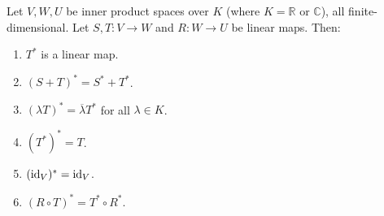 \begin{lemma}
\label{lem:properties_adjoint_map}
Let $V, W, U$ be inner product spaces over $K$ (where $K = \mathbb{R}$ or $\mathbb{C}$), all finite-di\-men\-sional. Let $S, T \colon V \to W$ and $R \colon W \to U$ be linear maps. Then:
\begin{enumerate}[label=\textbf{(\alph*)}]
    \item $T^*$ is a linear map.
    \item $(S+T)^* = S^* + T^*$.
    \item $(\lambda T)^* = \overline{\lambda} T^*$ for all $\lambda \in K$.
    \item $(T^*)^* = T$.
    \item $(\operatorname{id}_V)^* = \operatorname{id}_V$.
    \item $(R \circ T)^* = T^* \circ R^*$.
\end{enumerate}
\end{lemma}


